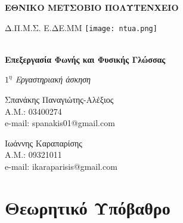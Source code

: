 \documentclass[a4paper,12pt]{article}
\begin{document}
\begin{titlepage}
    \begin{center}
        \vspace*{1cm}
        
        \Large
        \textbf{ΕΘΝΙΚΟ ΜΕΤΣΟΒΙΟ ΠΟΛΥΤΕΝΧΕΙΟ}
        
        \vspace*{0.5cm}

        \large 
        Δ.Π.Μ.Σ. Ε.ΔΕ.ΜΜ
        \texttt{[image: ntua.png]}

        \large
        \textbf{\\Επεξεργασία Φωνής και Φυσικής Γλώσσας}
        
        
        
        \vspace{2.5cm}
        \small
        \textit{$1^η$ Εργαστηριακή άσκηση}        
        


    
    \end{center}
    
    
    \begin{flushright}
        \vfill
        Σπανάκης Παναγιώτης-Αλέξιος
        \\Α.Μ.: 03400274
        \\e-mail: spanakis01@gmail.com
    \end{flushright}

    \begin{flushleft}
        \vfill
        Ιωάννης Καραπαρίσης
        \\Α.Μ.: 09321011
        \\e-mail: ikaraparisis@gmail.com
    \end{flushleft}
    
\end{titlepage}

\newpage


\section*{Θεωρητικό Υπόβαθρο}
\end{document}
